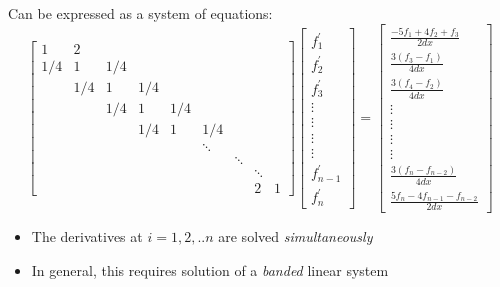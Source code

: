\documentclass[10pt]{beamer}
\begin{document}
\begin{frame}
\footnotesize
Can be expressed as a system of equations:
\begin{equation*}
 \begin{bmatrix}
     1&2\\
     1/4&1&1/4\\
     &1/4&1&1/4\\
     &&1/4&1&1/4\\
     &&&1/4&1&1/4\\
     &&&&&\ddots\\
     &&&&&&\ddots\\
     &&&&&&&\ddots\\
     &&&&&&&2&1
  \end{bmatrix}
  \begin{bmatrix}
      f^{\prime}_1 \\

      f^{\prime}_2 \\
      f^{\prime}_3 \\
      \vdots \\
      \vdots \\
      \vdots \\
      \vdots \\
      f^{\prime}_{n-1} \\
      f^{\prime}_n
   \end{bmatrix}
 =
 \begin{bmatrix}
     \frac{-5f_1 + 4f_2 + f_3}{2dx}\\
     \frac{3(f_{3} - f_{1})}{4dx}\\
     \frac{3(f_{4} - f_{2})}{4dx}\\
     \vdots\\
     \vdots\\
     \vdots\\
     \vdots\\
     \frac{3(f_{n} - f_{n-2})}{4dx}\\
     \frac{5f_{n} - 4f_{n-1} - f_{n-2}}{2dx}
  \end{bmatrix}
\end{equation*}

\pause
\begin{itemize}[<+->]
    \item The derivatives at $i=1,2, .. n$ are solved \emph{simultaneously}
    \item In general, this requires solution of a \emph{banded} linear system
\end{itemize}
\end{frame}
\end{document}
